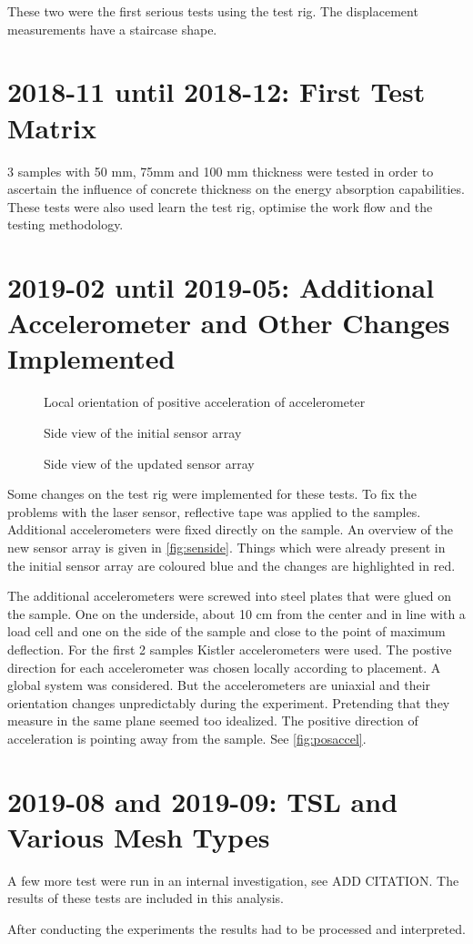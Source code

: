 These two were the first serious tests using the test rig. The displacement measurements have  a staircase shape.

\section{2018-11 until 2018-12: First Test Matrix}

3 samples with 50 mm, 75mm and 100 mm thickness were tested in order to ascertain the influence of concrete thickness on the energy absorption capabilities. These tests were also used learn the test rig, optimise the work flow and the testing methodology.

\section{2019-02 until 2019-05: Additional Accelerometer and Other Changes Implemented}

\begin{figure}[ht]
    \centering
    
    \caption{Local orientation of positive acceleration of accelerometer}
    \label{fig:posaccel}
\end{figure}

 \begin{figure}
     \centering
     
     \caption{Side view of the initial sensor array}
     \label{fig:sencam1}
 \end{figure}
 \begin{figure}
     \centering
     
     \caption{Side view of the updated sensor array}
     \label{fig:senside}
\end{figure}

Some changes on the test rig were implemented for these tests. To fix the problems with the laser sensor, reflective tape was applied to the samples. Additional accelerometers were fixed directly on the sample. An overview of the new sensor array is given in \autoref{fig:senside}. Things which were already present in the initial sensor array are coloured blue and the changes are highlighted in red. 

The additional accelerometers were screwed into steel plates that were glued on the sample. One on the underside, about 10 cm from the center and in line with a load cell and one on the side of the sample and close to the point of maximum deflection. For the first 2 samples Kistler accelerometers were used. The postive direction for each accelerometer was chosen locally according to placement. A global system was considered. But the accelerometers are uniaxial and their orientation changes unpredictably during the experiment. Pretending that they measure in the same plane seemed too idealized. The positive direction of acceleration is pointing away from the sample. See  \autoref{fig:posaccel}.

\section{2019-08 and 2019-09: TSL and Various Mesh Types}

A few more test were run in an internal investigation, see ADD CITATION.
The results of these tests are included in this analysis.

After conducting the experiments the results had to be processed and interpreted.

